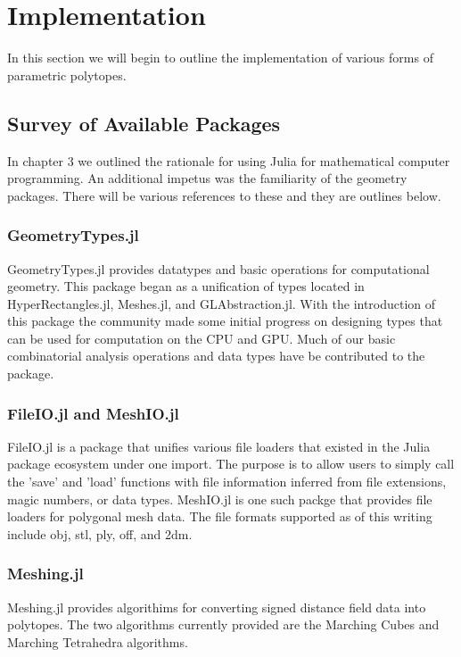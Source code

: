 \chapter{Implementation}

In this section we will begin to outline the implementation of
various forms of parametric polytopes.

\section{Survey of Available Packages}

In chapter 3 we outlined the rationale for using Julia for mathematical
computer programming. An additional impetus was the familiarity of the
geometry packages. There will be various references to these and they
are outlines below.

\subsection{GeometryTypes.jl}

GeometryTypes.jl provides datatypes and basic operations for computational
geometry. This package began as a unification of types located in
HyperRectangles.jl, Meshes.jl, and GLAbstraction.jl. With the introduction
of this package the community made some initial progress on designing
types that can be used for computation on the CPU and GPU. Much of
our basic combinatorial analysis operations and data types have be contributed
to the package.

\subsection{FileIO.jl and MeshIO.jl}

FileIO.jl is a package that unifies various file loaders that existed in
the Julia package ecosystem under one import. The purpose is to
allow users to simply call the 'save' and 'load' functions with file
information inferred from file extensions, magic numbers, or data types.
MeshIO.jl is one such packge that provides file loaders for
polygonal mesh data. The file formats supported as of this writing include
obj, stl, ply, off, and 2dm.

\subsection{Meshing.jl}

Meshing.jl provides algorithims for converting signed distance field
data into polytopes. The two algorithms currently provided are
the Marching Cubes and Marching Tetrahedra algorithms.

